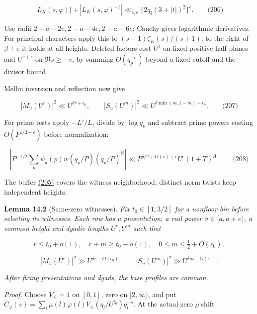 \hypertarget{dr:buffered}{}

\label{dr:buffered}

\[
|L_K(s,\varphi)|+|L_K(s,\varphi)^{-1}|
 \ll_{e,\epsilon}\{2q_{\mathfrak f}(3+|t|)^2\}^{\epsilon}.
 \qquad\text{(206)}
\]

Use radii \(2-a-2e,2-a-4e,2-a-6e\); Cauchy gives logarithmic derivatives. For principal characters apply this to \((s-1)\zeta_K(s)/(s+1)\); to the right of \(\beta+e\) it holds at all heights. Deleted factors cost \(U^\epsilon\) on fixed positive half-planes and \(U^{v+\epsilon}\) on \(\Re s\ge-v\), by summing \(O(q_p^{-\sigma})\) beyond a fixed cutoff and the divisor bound.

Mellin inversion and reflection now give

\hypertarget{dr:saturation-upper}{}

\label{dr:saturation-upper}

\[
|M_u(U^r)|^2\ll U^{\delta r+\epsilon_0},\qquad
 |S_u(U^m)|^2\ll U^{\delta\min(m,1-m)+\epsilon_0}.
 \qquad\text{(207)}
\]

For prime tests apply \(-L'/L\), divide by \(\log q_p\) and subtract prime powers costing \(O(P^{1/2+\epsilon})\) before normalization:

\hypertarget{dr:prime-upper}{}

\label{dr:prime-upper}

\[
\left|P^{-1/2}\sum_p\overline{\psi_u(p)}w(q_p/P)
 (q_p/P)^{it}\right|
 \ll P^{\delta/2+O(e)+\epsilon}U^\epsilon(1+T)^A.
 \qquad\text{(208)}
\]

The buffer \protect\hyperlink{dr:bins}{(205)} covers the witness neighborhood; distinct norm twists keep independent heights.

\textbf{Lemma 14.2} (Same-zero witnesses). \emph{\hypertarget{dr:same-zero}{}\label{dr:same-zero} Fix \(t_0\in[1,3/2]\) for a nonfloor bin before selecting its witnesses. Each row has a presentation, a real power \(\sigma\in[a,a+e)\), a common height and dyadic lengths \(U^r,U^m\) such that}

\[
r\le t_0+o(1),\quad r+m\ge t_0-o(1),\quad
 0\le m\le\tfrac12+O(\epsilon_0),
\]

\[
|M_u(U^r)|^2\gg U^{\delta r-O(\epsilon_0)},\qquad
 |S_u(U^m)|^2\gg U^{\delta m-O(\epsilon_0)}.
\]

\emph{After fixing presentations and dyads, the base profiles are common.}

\emph{Proof.} Choose \(V_\le=1\) on \([0,1]\), zero on \([2,\infty)\), and put \(C_\varphi(s)=\sum_l\mu(l)\varphi(l)V_\le(q_l/U^{t_0})q_l^{-s}\). At the actual zero \(\rho\) shift

